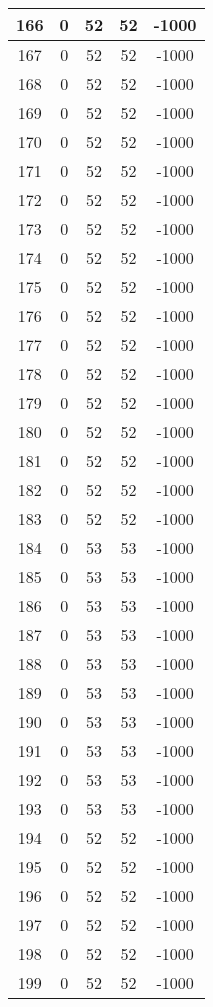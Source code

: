 \documentclass[letterpaper, 12pt]{article}
\begin{document}
\begin{longtable}{|c|c|c|c|c|}
\hline
166 & 0 & 52 & 52 & -1000 \\
\hline
167 & 0 & 52 & 52 & -1000 \\
\hline
168 & 0 & 52 & 52 & -1000 \\
\hline
169 & 0 & 52 & 52 & -1000 \\
\hline
170 & 0 & 52 & 52 & -1000 \\
\hline
171 & 0 & 52 & 52 & -1000 \\
\hline
172 & 0 & 52 & 52 & -1000 \\
\hline
173 & 0 & 52 & 52 & -1000 \\
\hline
174 & 0 & 52 & 52 & -1000 \\
\hline
175 & 0 & 52 & 52 & -1000 \\
\hline
176 & 0 & 52 & 52 & -1000 \\
\hline
177 & 0 & 52 & 52 & -1000 \\
\hline
178 & 0 & 52 & 52 & -1000 \\
\hline
179 & 0 & 52 & 52 & -1000 \\
\hline
180 & 0 & 52 & 52 & -1000 \\
\hline
181 & 0 & 52 & 52 & -1000 \\
\hline
182 & 0 & 52 & 52 & -1000 \\
\hline
183 & 0 & 52 & 52 & -1000 \\
\hline
184 & 0 & 53 & 53 & -1000 \\
\hline
185 & 0 & 53 & 53 & -1000 \\
\hline
186 & 0 & 53 & 53 & -1000 \\
\hline
187 & 0 & 53 & 53 & -1000 \\
\hline
188 & 0 & 53 & 53 & -1000 \\
\hline
189 & 0 & 53 & 53 & -1000 \\
\hline
190 & 0 & 53 & 53 & -1000 \\
\hline
191 & 0 & 53 & 53 & -1000 \\
\hline
192 & 0 & 53 & 53 & -1000 \\
\hline
193 & 0 & 53 & 53 & -1000 \\
\hline
194 & 0 & 52 & 52 & -1000 \\
\hline
195 & 0 & 52 & 52 & -1000 \\
\hline
196 & 0 & 52 & 52 & -1000 \\
\hline
197 & 0 & 52 & 52 & -1000 \\
\hline
198 & 0 & 52 & 52 & -1000 \\
\hline
199 & 0 & 52 & 52 & -1000 \\
\hline
\end{longtable}
\end{document}
